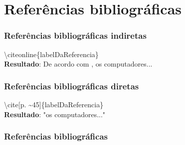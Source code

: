 \documentclass[aspectratio=169]{beamer}
\begin{document}
	\section{Refer\^{e}ncias bibliogr\'{a}ficas}
	\begin{frame}
		\frametitle{Refer\^{e}ncias bibliogr\'{a}ficas indiretas}
		\textbackslash citeonline\{labelDaReferencia\}\\
		\textbf{Resultado}: De acordo com , os computadores...
	\end{frame}
		
	\begin{frame}
		\frametitle{Refer\^{e}ncias bibliogr\'{a}ficas diretas}
		\textbackslash cite[p. \~{}45]\{labelDaReferencia\} \\
		\textbf{Resultado}: "os computadores..." \cite[p.~45]{tanebaun2010} 
	\end{frame}	

	\begin{frame}
		\frametitle{Refer\^{e}ncias bibliogr\'{a}ficas}
		
	\end{frame}
\end{document}

